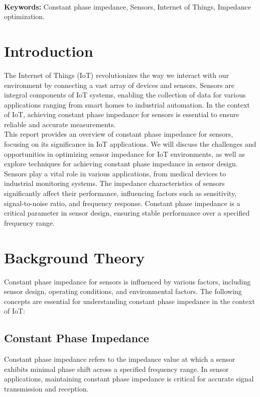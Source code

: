 \documentclass[12pt]{report}
\begin{document}
\textbf{\\Keywords:} Constant phase impedance, Sensors, Internet of Things, Impedance optimization.

\newpage
\section*{Introduction}
The Internet of Things (IoT)\cite{phase} revolutionizes the way we interact with our environment by connecting a vast array of devices and sensors. Sensors are integral components of IoT systems, enabling the collection of data for various applications ranging from smart homes to industrial automation. In the context of IoT, achieving constant phase impedance for sensors is essential to ensure reliable and accurate measurements.\\

This report provides an overview\cite{smart} of constant phase impedance for sensors, focusing on its significance in IoT applications. We will discuss the challenges and opportunities in optimizing sensor impedance for IoT environments, as well as explore techniques for achieving constant phase impedance in sensor design.\\

Sensors play a vital role in various applications, from medical devices to industrial monitoring systems. The impedance characteristics of sensors significantly affect their performance, influencing factors such as sensitivity, signal-to-noise ratio, and frequency response. Constant phase impedance is a critical parameter in sensor design, ensuring stable performance over a specified frequency range.





\newpage
\section*{Background Theory}
Constant phase impedance\cite{smart} for sensors is influenced by various factors, including sensor design, operating conditions, and environmental factors. The following concepts are essential for understanding constant phase impedance in the context of IoT:
\subsection*{Constant Phase Impedance}  Constant phase impedance refers to the impedance value at which a sensor exhibits minimal phase shift across a specified frequency range. In sensor applications, maintaining constant phase impedance is critical for accurate signal transmission and reception.
\end{document}
